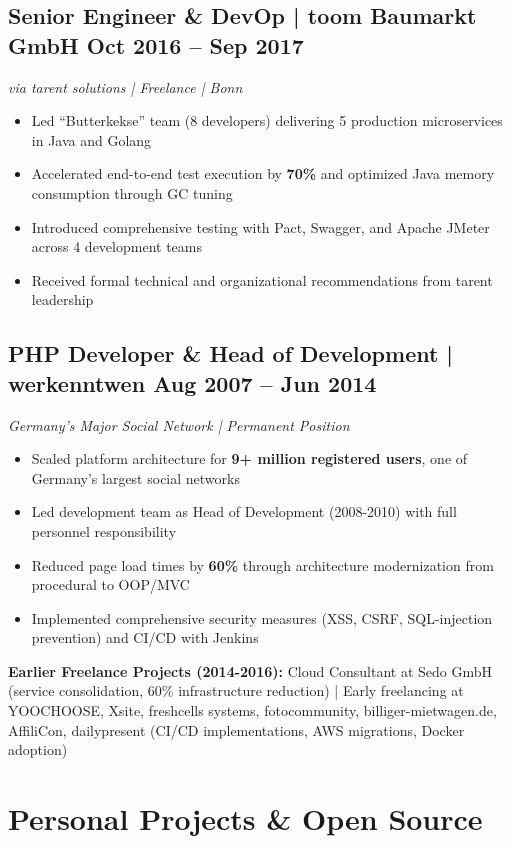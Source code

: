 \documentclass[10pt,a4paper]{article}
\begin{document}
\subsection*{Senior Engineer \& DevOp | toom Baumarkt GmbH \hfill Oct 2016 -- Sep 2017}
\textit{via tarent solutions | Freelance | Bonn}
\begin{itemize}
\item Led ``Butterkekse'' team (8 developers) delivering 5 production microservices in Java and Golang
\item Accelerated end-to-end test execution by \textbf{70\%} and optimized Java memory consumption through GC tuning
\item Introduced comprehensive testing with Pact, Swagger, and Apache JMeter across 4 development teams
\item Received formal technical and organizational recommendations from tarent leadership
\end{itemize}

\subsection*{PHP Developer \& Head of Development | werkenntwen \hfill Aug 2007 -- Jun 2014}
\textit{Germany's Major Social Network | Permanent Position}
\begin{itemize}
\item Scaled platform architecture for \textbf{9+ million registered users}, one of Germany's largest social networks
\item Led development team as Head of Development (2008-2010) with full personnel responsibility
\item Reduced page load times by \textbf{60\%} through architecture modernization from procedural to OOP/MVC
\item Implemented comprehensive security measures (XSS, CSRF, SQL-injection prevention) and CI/CD with Jenkins
\end{itemize}

\textbf{Earlier Freelance Projects (2014-2016):} Cloud Consultant at Sedo GmbH (service consolidation, 60\% infrastructure reduction) | Early freelancing at YOOCHOOSE, Xsite, freshcells systems, fotocommunity, billiger-mietwagen.de, AffiliCon, dailypresent (CI/CD implementations, AWS migrations, Docker adoption)

\section*{Personal Projects \& Open Source}
\end{document}

